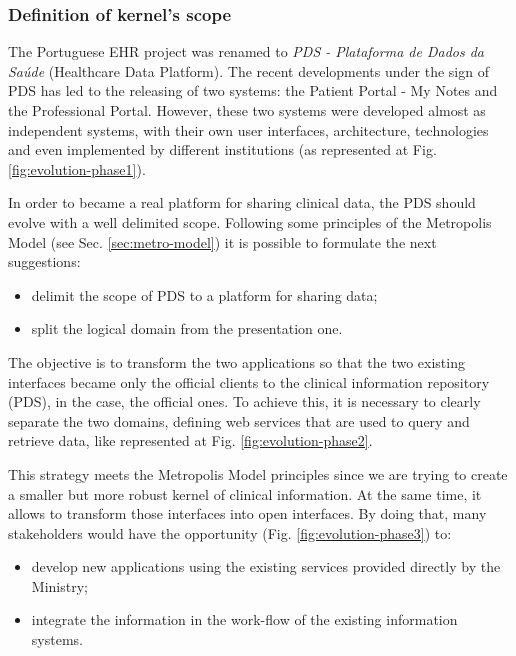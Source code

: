 \subsubsection{Definition of kernel's scope}

The Portuguese EHR project was renamed to \textit{PDS - Plataforma de Dados da Saúde} (Healthcare Data Platform). The recent developments under the sign of PDS has led to the releasing of two systems: the Patient Portal - My Notes and the Professional Portal. However, these two systems were developed almost as independent systems, with their own user interfaces, architecture, technologies and even implemented by different institutions (as represented at Fig. \ref{fig:evolution-phase1}).


In order to became a real platform for sharing clinical data, the PDS should evolve with a well delimited scope. Following some principles of the Metropolis Model (see Sec. \ref{sec:metro-model}) it is possible to formulate the next suggestions:
\begin{itemize}
\item delimit the scope of PDS to a platform for sharing data;
\item split the logical domain from the presentation one.
\end{itemize}

The objective is to transform the two applications so that the two existing interfaces became only the official clients to the clinical information repository (PDS), in the case, the official ones. To achieve this, it is necessary to clearly separate the two domains, defining web services that are used to query and retrieve data, like represented at Fig. \ref{fig:evolution-phase2}.


This strategy meets the Metropolis Model principles since we are trying to create a smaller but more robust kernel of clinical information. At the same time, it allows to transform those interfaces into open interfaces. By doing that, many stakeholders would have the opportunity (Fig. \ref{fig:evolution-phase3}) to: 
\begin{itemize}
\item develop new applications using the existing services provided directly by the Ministry;
\item integrate the information in the work-flow of the existing information systems.
\end{itemize}

